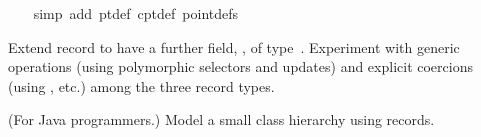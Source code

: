 \begin{isabellebody}
%
\isadelimproof
\ \ %
\endisadelimproof
%
\isatagproof
{}\isamarkupfalse%
\ {\isacharparenleft}simp\ add{\isacharcolon}\ pt{}{\isacharunderscore}def\ cpt{}{\isacharunderscore}def\ point{\isachardot}defs{\isacharparenright}%
\endisatagproof
{\isafoldproof}%
%
\isadelimproof
%
\endisadelimproof
%
\begin{isamarkuptext}%
\begin{exercise}
  Extend record  to have a further field, , of type~.  Experiment with generic operations
  (using polymorphic selectors and updates) and explicit coercions
  (using ,  etc.) among the three record
  types.
  \end{exercise}

  \begin{exercise}
  (For Java programmers.)
  Model a small class hierarchy using records.
  \end{exercise}
\end{isamarkuptext}%
\isamarkuptrue%
%
\isadelimtheory
%
\endisadelimtheory
%
\isatagtheory
%
\endisatagtheory
{\isafoldtheory}%
%
\isadelimtheory
%
\endisadelimtheory
\end{isabellebody}%
